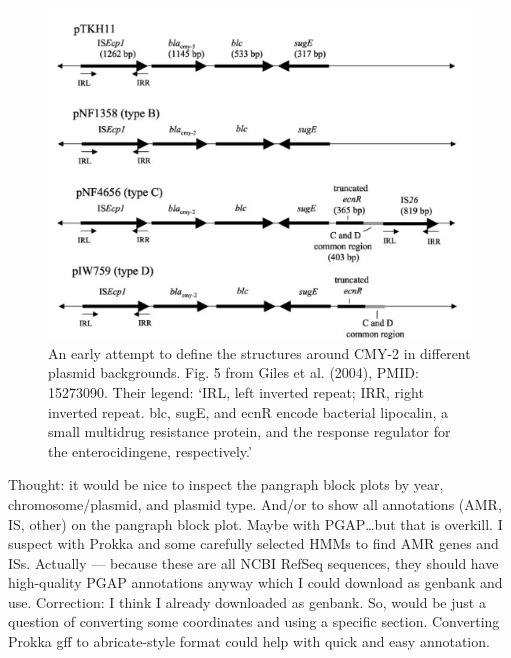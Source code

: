 \documentclass[aps,rmp,preprint,superscriptaddress,10pt,twocolumn]{revtex4-1}
\begin{document}
\begin{figure}
    \centering
\includegraphics[width=0.8\linewidth]{figs/giles-2004-fig5.png}
    \caption{An early attempt to define the structures around CMY-2 in different plasmid backgrounds. Fig. 5 from Giles et al. (2004), PMID: 15273090. Their legend: `IRL, left inverted repeat; IRR, right inverted repeat. blc, sugE, and ecnR encode bacterial lipocalin, a small multidrug resistance protein, and the response regulator for the enterocidingene, respectively.'}
    \label{fig:CMY-2-giles-2004}
\end{figure}

Thought: it would be nice to inspect the pangraph block plots by year, chromosome/plasmid, and plasmid type. And/or to show all annotations (AMR, IS, other) on the pangraph block plot. Maybe with PGAP\ldots but that is overkill. I suspect with Prokka and some carefully selected HMMs to find AMR genes and ISs. Actually {---} because these are all NCBI RefSeq sequences, they should have high-quality PGAP annotations anyway which I could download as genbank and use. Correction: I think I already downloaded as genbank. So, would be just a question of converting some coordinates and using a specific section.  Converting Prokka gff to abricate-style format could help with quick and easy annotation. 
\end{document}
